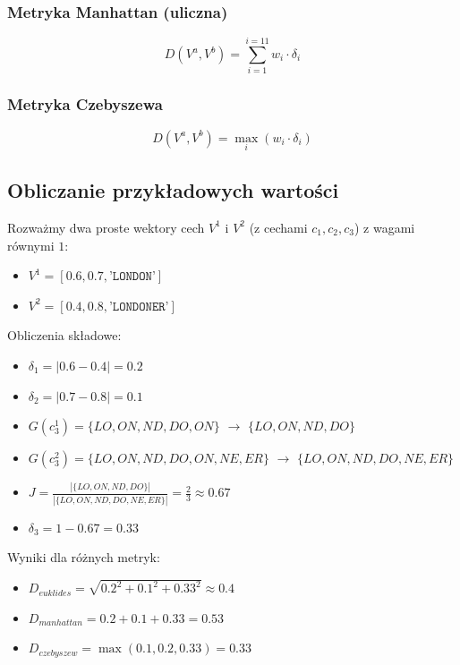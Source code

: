 \documentclass{article}
\begin{document}
	\subsubsection{Metryka Manhattan (uliczna)}
	\begin{equation}
		D(V^a,V^b) = \sum_{i=1}^{i=11} w_i \cdot \delta_i
	\end{equation}
	
	\subsubsection{Metryka Czebyszewa}
	\begin{equation}
		D(V^a,V^b) = \max_{i} (w_i \cdot \delta_i)
	\end{equation}
	
	\subsection{Obliczanie przykładowych wartości}
	Rozważmy dwa proste wektory cech \(V^1\) i \(V^2\) (z cechami \(c_1, c_2, c_3\)) z wagami równymi \(1\):
	\begin{itemize}
		\item \(V^1 = [0.6, 0.7, \texttt{'LONDON'}]\)
		\item \(V^2 = [0.4, 0.8, \texttt{'LONDONER'}]\)
	\end{itemize}
	
	\noindent
	Obliczenia składowe:
	\begin{itemize}
		\item \(\delta_1 = |0.6 - 0.4| = 0.2\)
		\item \(\delta_2 = |0.7 - 0.8| = 0.1\)
		\item \(G(c_3^1) = \{LO, ON, ND, DO, ON\}\) \(\rightarrow\) \(\{LO, ON, ND, DO\}\)
		\item \(G(c_3^2) = \{LO, ON, ND, DO, ON, NE, ER\}\) \(\rightarrow\) \(\{LO, ON, ND, DO, NE, ER\}\)
		\item \(J = \frac{|\{LO, ON, ND, DO\}|}{|\{LO, ON, ND, DO, NE, ER\}|} = \frac{2}{3} \approx 0.67\)
		\item \(\delta_3 = 1 - 0.67 = 0.33\)
	\end{itemize}
	
	\noindent
	Wyniki dla różnych metryk:
	\begin{itemize}
		\item \(D_{euklides} = \sqrt{0.2^2 + 0.1^2 + 0.33^2} \approx 0.4\)
		\item \(D_{manhattan} = 0.2 + 0.1 + 0.33 = 0.53\)
		\item \(D_{czebyszew} = \max(0.1, 0.2, 0.33) = 0.33\)
	\end{itemize}
	
\end{document}
